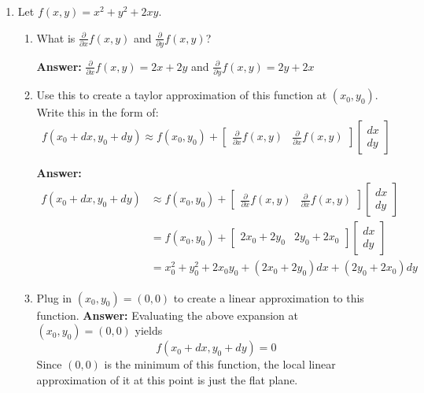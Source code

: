 \documentclass[12pt]{article}
\newcommand{\answer}[1]{{\color{blue_winged_teal}\textbf{Answer:} #1}}
\begin{document}
\begin{enumerate}
  \bigskip\bigskip
  \item Let $f(x, y) = x^2 + y^2 + 2xy$.
  \begin{enumerate}
    \item What is $\frac{\partial}{\partial x} f(x,y)$ and $\frac{\partial}{\partial y} f(x,y)$?
    
    \answer{
      $\frac{\partial}{\partial x} f(x,y) = 2x + 2y$ and 
      $\frac{\partial}{\partial y} f(x,y) = 2y + 2x$
    }
    
    \item Use this to create a taylor approximation of this function at $(x_0, y_0)$. Write this in the form of:
    $$
      f(x_0 + dx, y_0 + dy) \approx f(x_0, y_0) + \begin{bmatrix}\frac{\partial}{\partial x} f(x,y) & \frac{\partial}{\partial x} f(x,y)\end{bmatrix} \begin{bmatrix}dx \\ dy\end{bmatrix}
    $$

    \answer{
      \begin{align*}
        f(x_0 + dx, y_0 + dy) &\approx f(x_0, y_0) + \begin{bmatrix}\frac{\partial}{\partial x} f(x,y) & \frac{\partial}{\partial x} f(x,y)\end{bmatrix} \begin{bmatrix}dx \\ dy\end{bmatrix} \\
        &= f(x_0, y_0) + \begin{bmatrix} 2x_0 + 2y_0 & 2y_0 + 2x_0 \end{bmatrix} \begin{bmatrix}dx \\ dy\end{bmatrix} \\
        &= x_0^2 + y_0^2 + 2x_0y_0 + (2x_0 + 2y_0) dx + (2y_0 + 2x_0) dy
      \end{align*}
    }

    \item Plug in $(x_0, y_0) = (0, 0)$ to create a linear approximation to this function.
    \answer{
      Evaluating the above expansion at $(x_0, y_0) = (0, 0)$ yields
      $$
        f(x_0 + dx, y_0 + dy) = 0
      $$
      Since $(0, 0)$ is the minimum of this function, the local linear approximation of it at this point is just the flat plane.
    }
  \end{enumerate}
\end{enumerate}
\end{document}
